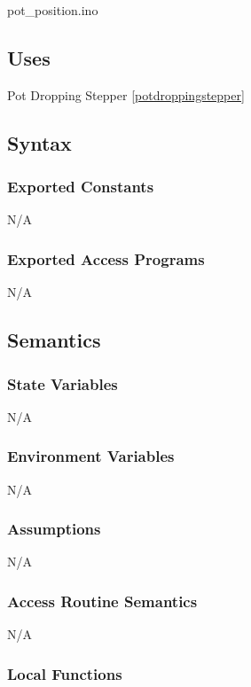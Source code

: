\documentclass[12pt, titlepage]{article}
\begin{document}
pot\_position.ino

\subsection{Uses}
Pot Dropping Stepper \ref{potdroppingstepper}

\subsection{Syntax}

\subsubsection{Exported Constants}

N/A

\subsubsection{Exported Access Programs}

N/A

\subsection{Semantics}

\subsubsection{State Variables}

N/A
\subsubsection{Environment Variables}

N/A

\subsubsection{Assumptions}

N/A

\subsubsection{Access Routine Semantics}

N/A



\subsubsection{Local Functions}
\end{document}
